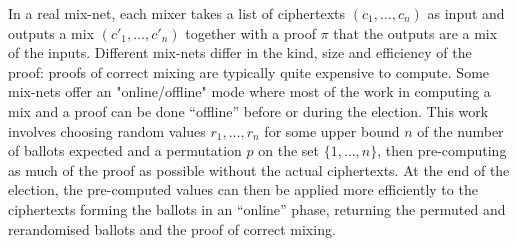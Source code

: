 \documentclass{llncs}
\begin{document}
In a real mix-net, each mixer takes a list of ciphertexts $(c_1, \ldots, c_n)$
as input and outputs a mix $(c'_1, \ldots, c'_n)$ together with a proof $\pi$
that the outputs are a mix of the inputs. Different mix-nets differ in the kind,
size and efficiency of the proof: proofs of correct mixing are typically
quite expensive to compute. Some mix-nets offer an "online/offline" mode where
most of the work in computing a mix and a proof can be done ``offline'' before
or during the election. This work involves choosing random values $r_1, \ldots,
r_n$ for some upper bound $n$ of the number of ballots expected and a
permutation $p$ on the set $\{1, \ldots, n\}$, then pre-computing as much of the
proof as possible without the actual ciphertexts. At the end of the election,
the pre-computed values can then be applied more efficiently to the ciphertexts
forming the ballots in an ``online'' phase, returning the permuted and
rerandomised ballots and the proof of correct mixing.
\end{document}
